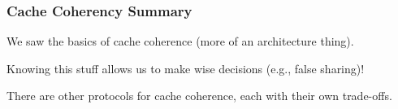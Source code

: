 \begin{frame}
  \frametitle{Cache Coherency Summary}
  
We saw the basics of cache coherence (more of an architecture
      thing).
      
Knowing this stuff allows us to make wise decisions (e.g., false sharing)!      
      
There are other protocols for cache coherence, each with their own
      trade-offs.


  
\end{frame}




